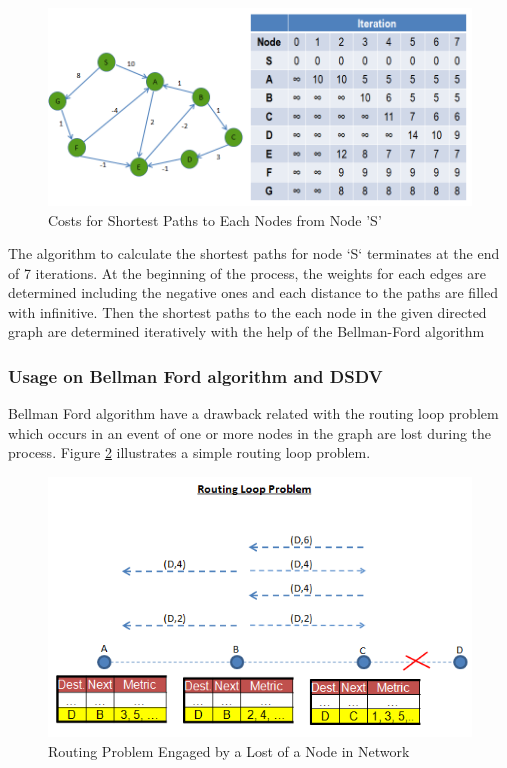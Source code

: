 \begin{figure}[H]
\caption{Costs for Shortest Paths to Each Nodes from Node 'S'} \label{bellman_ref}
\centering
\includegraphics[scale = 0.65]{bellman}
\end{figure}

The algorithm to calculate the shortest paths for node `S` terminates at the end of 7 iterations. At the beginning of the process, the weights for each edges are determined including the negative ones and each distance to the paths are filled with infinitive. Then the shortest paths to the each node in the given directed graph are determined iteratively with the help of the Bellman-Ford algorithm

\subsubsection{Usage on Bellman Ford algorithm and DSDV}
Bellman Ford algorithm have a drawback related with the routing loop problem which occurs in an event of one or more nodes in the graph are lost during the process. Figure \ref{routing_problem2} illustrates a simple routing loop problem.

\begin{figure}[H] 
\caption{Routing Problem Engaged by a Lost of a Node in Network} \label{routing_problem2}
\centering
\includegraphics[scale = 0.65]{routing_problem}
\end{figure}

